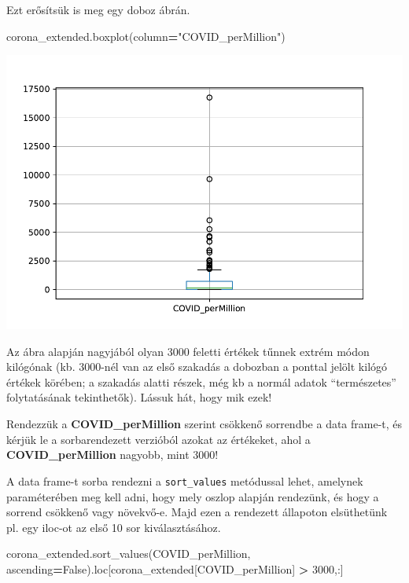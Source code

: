 \documentclass[
]{book}
\newenvironment{Shaded}{\begin{snugshade}}{\end{snugshade}}
\newcommand{\DecValTok}[1]{\textcolor[rgb]{0.00,0.00,0.81}{#1}}
\newcommand{\NormalTok}[1]{#1}
\newcommand{\OperatorTok}[1]{\textcolor[rgb]{0.81,0.36,0.00}{\textbf{#1}}}
\newcommand{\StringTok}[1]{\textcolor[rgb]{0.31,0.60,0.02}{#1}}
\newcommand{\VariableTok}[1]{\textcolor[rgb]{0.00,0.00,0.00}{#1}}
\begin{document}
Ezt erősítsük is meg egy doboz ábrán.

\begin{Shaded}
\begin{Highlighting}[]
\NormalTok{corona\_extended.boxplot(column}\OperatorTok{=}\StringTok{"COVID\_perMillion"}\NormalTok{)}
\end{Highlighting}
\end{Shaded}

\includegraphics{_main_files/figure-latex/unnamed-chunk-116-9.pdf}

Az ábra alapján nagyjából olyan 3000 feletti értékek tűnnek extrém módon kilógónak (kb. 3000-nél van az első szakadás a dobozban a ponttal jelölt kilógó értékek körében; a szakadás alatti részek, még kb a normál adatok ``természetes'' folytatásának tekinthetők). Lássuk hát, hogy mik ezek!

Rendezzük a \textbf{COVID\_perMillion} szerint csökkenő sorrendbe a data frame-t, és kérjük le a sorbarendezett verzióból azokat az értékeket, ahol a \textbf{COVID\_perMillion} nagyobb, mint 3000!

A data frame-t sorba rendezni a \texttt{sort\_values} metódussal lehet, amelynek paraméterében meg kell adni, hogy mely oszlop alapján rendezünk, és hogy a sorrend csökkenő vagy növekvő-e. Majd ezen a rendezett állapoton elsüthetünk pl. egy iloc-ot az első 10 sor kiválasztásához.

\begin{Shaded}
\begin{Highlighting}[]
\NormalTok{corona\_extended.sort\_values(}\StringTok{\textquotesingle{}COVID\_perMillion\textquotesingle{}}\NormalTok{, ascending}\OperatorTok{=}\VariableTok{False}\NormalTok{).loc[corona\_extended[}\StringTok{\textquotesingle{}COVID\_perMillion\textquotesingle{}}\NormalTok{] }\OperatorTok{\textgreater{}} \DecValTok{3000}\NormalTok{,:]}
\end{Highlighting}
\end{Shaded}
\end{document}
